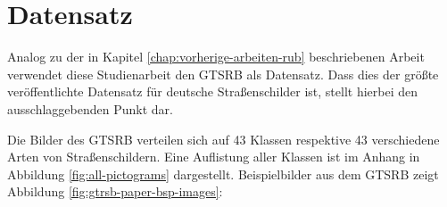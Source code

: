 \section{Datensatz}

\label{chap:3-Datensatz}
Analog zu der in Kapitel \ref{chap:vorherige-arbeiten-rub} beschriebenen Arbeit verwendet diese Studienarbeit den \ac{GTSRB} als Datensatz. Dass dies der größte veröffentlichte Datensatz für deutsche Straßenschilder ist, stellt hierbei den ausschlaggebenden Punkt dar.

Die Bilder des \ac{GTSRB} verteilen sich auf 43 Klassen respektive 43 verschiedene Arten von Straßenschildern. Eine Auflistung aller Klassen ist im Anhang in Abbildung \ref{fig:all-pictograms} dargestellt. Beispielbilder aus dem \ac{GTSRB} zeigt Abbildung \ref{fig:gtrsb-paper-bsp-images}: \cite{GTSRB}


